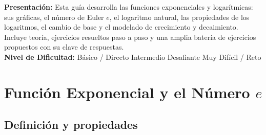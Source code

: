 \documentclass[12pt, letterpaper]{article}
\begin{document}

\vspace{4pt}
\begin{cuadroinfo}
  \small
  \textbf{Presentación:} Esta guía desarrolla las funciones exponenciales y logarítmicas: sus gráficas, el número de Euler $e$, el logaritmo natural, las propiedades de los logaritmos, el cambio de base y el modelado de crecimiento y decaimiento. Incluye teoría, ejercicios resueltos paso a paso y una amplia batería de ejercicios propuestos con su clave de respuestas.
  \\[4pt]
  \textbf{Nivel de Dificultad:}\quad
  \facil{} Básico / Directo \quad
  \medio{} Intermedio \quad
  \dificil{} Desafiante \quad
  \muyDificil{} Muy Difícil / Reto
\end{cuadroinfo}

\vspace{8pt}

\section{Función Exponencial y el Número $e$}

\subsection{Definición y propiedades}
\end{document}
